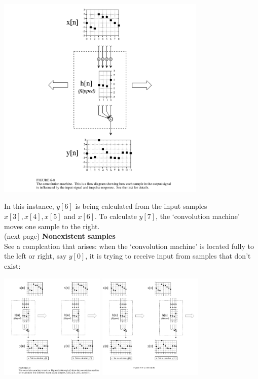\documentclass{report}
\begin{document}
\begin{center}
\includegraphics[width=10cm]{a5}\\
\end{center}
In this instance, $y[6]$ is being calculated from the input samples $x[3],x[4],x[5]$ and $x[6]$. 
To calculate $y[7]$, the 
`convolution machine' moves one sample to the right.\\
(next page)\newpage
\noindent\textbf{Nonexistent samples}\\
See a complcation that arises: when the `convolution machine' is located fully to the left or right, say $y[0]$,
it is trying to receive input from samples that don't exist:
\begin{center}
\includegraphics[width=5cm]{a6}
\includegraphics[width=5cm]{a7}\\
\end{center}
\end{document}
